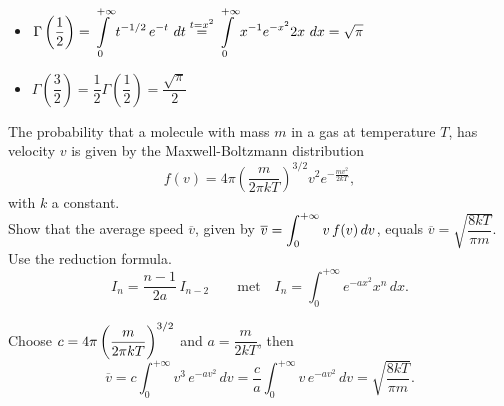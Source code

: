 \begin{Answer}
    \Question \begin{itemize}
    \item $\Gamma\left(\dfrac{1}{2}\right) = \displaystyle \int \limits_0^{+\infty} t^{-1/2}\, e^{-t}\ dt \stackrel{t=x^2}{=} \displaystyle \int \limits_0^{+\infty} x^{-1} e^{-x^2}2x\ dx = \sqrt{\pi}$
    \item $\Gamma\left(\dfrac{3}{2}\right) = \dfrac{1}{2}\Gamma\left(\dfrac{1}{2}\right) = \dfrac{\sqrt{\pi}}{2}$
    \end{itemize}
    
\end{Answer}
\fi


\ifanalysis
\begin{Exercise}[difficulty = 3] The probability that a molecule with mass $m$ in a gas at temperature $T$, has velocity $v$ is given by the Maxwell-Boltzmann distribution
\[f(v) = 4\pi\left(\dfrac{m}{2\pi kT}\right)^{3/2}v^2e^{-\frac{mv^2}{2kT}},\]
with $k$ a constant. \\
Show that the average speed $\overline{v}$, given by $\displaystyle \overline{v} = \int_0^{+\infty} v\,f(v)\, dv$, equals $\overline{v} = \sqrt{ \dfrac{8kT}{\pi m} }$. \\
Use the reduction formula.
\[ I_n = \dfrac{n-1}{2a}\, I_{n-2}\qquad\mbox{met}\quad I_n = \int_0^{+\infty} e^{-ax^2}x^n\, dx. \]
\end{Exercise}

\begin{Answer}
    Choose $\displaystyle c=4\pi\left(\dfrac{m}{2\pi kT}\right)^{3/2}$ and $a=\dfrac{m}{2kT}$, then
    \[\overline{v} = c\int_0^{+\infty} v^3\,e^{-av^2}\, dv = \dfrac{c}{a}\int_0^{+\infty} v\,e^{-av^2}\, dv = \sqrt{\dfrac{8kT}{\pi m}}.\]
\end{Answer}
\fi

\ifanalysis\pagebreak\fi




